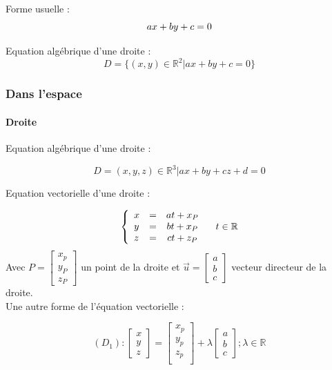 Forme usuelle : 
\begin{equation}
ax+by+c=0\\
\end{equation}


Equation algébrique d'une droite :
\begin{equation}
D=\{(x,y) \in \mathbb{R} ^2 |ax+by+c=0\}
\end{equation}

\subsubsection{Dans l'espace}
\paragraph{Droite}
Equation algébrique d'une droite :

\begin{equation}
D={(x,y,z) \in \mathbb{R} ^3 |ax+by+cz+d=0}
\end{equation}

Equation vectorielle d'une droite :

\begin{eqnarray}
\left\{
\begin{array}{l c c r}   
x &=& a t+ x_P &\\
y &=& b t+ x_P & \\
z &=& c t + z_P & 
\end{array}\right.
t \in \mathbb{R}
\end{eqnarray}
Avec 
$P=
\begin{bmatrix}
x_p \\
y_P\\
z_P
\end{bmatrix}
$ 
un point de la droite et $\vec{u}=\begin{bmatrix}
a\\ b\\ c
\end{bmatrix}$ vecteur directeur de la droite.\\

Une autre forme de l'équation vectorielle :

\begin{equation}
(D_1):
\begin{bmatrix}
x \\
y\\
z
\end{bmatrix}
=
\begin{bmatrix}
x_p\\
y_p\\
z_p\\
\end{bmatrix}
+
\lambda
\begin{bmatrix}
a\\
b \\
c
\end{bmatrix}
; \lambda \in \mathbb{R}
\end{equation}
